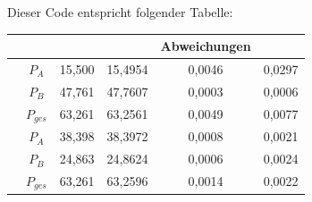 	Dieser Code entspricht folgender Tabelle:
		\begin{table}[H]
		\centering
		\renewcommand{\arraystretch}{2} %
		\setlength{\tabcolsep}{0.3em} %
		
		\begin{tabular}{|c|c|S[ table-format = 2.3]|S[ table-format = 2.3]|
				S[ table-format = 1.4]|S[ table-format = 1.4]|}
			\hline
			& {} & {} &{Abweichungen} 
			&{} \\ \hline
			&  $P_A$ & 15,500 & 15,4954 & 0,0046 & 0,0297 \\  
			& $P_B$ & 47,761 & 47,7607 & 0,0003 & 0,0006 \\  
			& $P_{ges}$ & 63,261 & 63,2561 & 0,0049 & 0,0077 \\ \hline
			& $P_A$ & 38,398 & 38,3972 & 0,0008 & 0,0021 \\  
			& $P_B$ & 24,863 & 24,8624 & 0,0006 & 0,0024 \\  
			& $P_{ges}$ & 63,261 & 63,2596 & 0,0014 & 0,0022 \\ \hline
		\end{tabular}
	\end{table}




	\newpage
